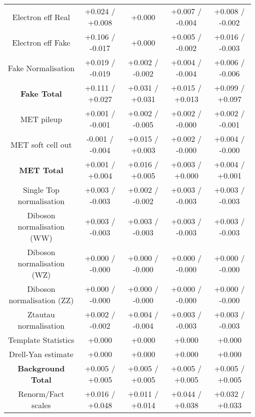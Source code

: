 \begin{table}[htbp]
\begin{center}
\begin{tabular}{|c|c|c|c|c|}
Electron eff Real                     &+0.024   / +0.008   & +0.000              & +0.007   / -0.004   & +0.008   / -0.002  \\
Electron eff Fake                     &+0.106   / -0.017   & +0.000              & +0.005   / -0.002   & +0.016   / -0.003  \\
Fake Normalisation                    &+0.019   / -0.019   & +0.002   / -0.002   & +0.004   / -0.004   & +0.006   / -0.006  \\
\hline
\textbf{Fake Total}                   &+0.111   / +0.027   & +0.031   / +0.031   & +0.015   / +0.013   & +0.099   / +0.097  \\
\hline
MET pileup                            &+0.001   / -0.001   & +0.002   / -0.005   & +0.002   / -0.000   & +0.002   / -0.001  \\
MET soft cell out                     &-0.001   / -0.004   & +0.015   / +0.003   & +0.002   / -0.000   & +0.004   / -0.000  \\
\hline
\textbf{MET Total}                    &+0.001   / +0.004   & +0.016   / +0.005   & +0.003   / +0.000   & +0.004   / +0.001  \\
\hline
Single Top normalisation              &+0.003   / -0.003   & +0.002   / -0.002   & +0.003   / -0.003   & +0.003   / -0.003  \\
Diboson normalisation (WW)            &+0.003   / -0.003   & +0.003   / -0.003   & +0.003   / -0.003   & +0.003   / -0.003  \\
Diboson normalisation (WZ)            &+0.000   / -0.000   & +0.000   / -0.000   & +0.000   / -0.000   & +0.000   / -0.000  \\
Diboson normalisation (ZZ)            &+0.000   / -0.000   & +0.000   / -0.000   & +0.000   / -0.000   & +0.000   / -0.000  \\
Ztautau normalisation                 &+0.002   / -0.002   & +0.004   / -0.004   & +0.003   / -0.003   & +0.003   / -0.003  \\
Template Statistics                   &+0.000              & +0.000              & +0.000              & +0.000             \\
Drell-Yan estimate                    &+0.000              & +0.000              & +0.000              & +0.000             \\
\hline
\textbf{Background Total}             &+0.005   / +0.005   & +0.005   / +0.005   & +0.005   / +0.005   & +0.005   / +0.005  \\
\hline
Renorm/Fact scales                    &+0.016   / +0.048   & +0.011   / +0.014   & +0.044   / +0.038   & +0.032   / +0.033  \\

\end{tabular}
\end{center}
\end{table}
